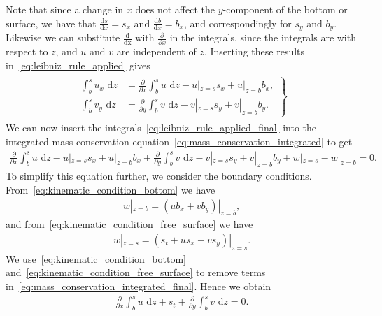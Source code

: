 Note that since a change in $x$ does not affect the $y$-component of the bottom or surface, we have that $\frac{\text{d} s}{\text{d} x} = s_x$ and $ \frac{\text{d} b}{\text{d} x} = b_x$, and correspondingly for $s_y$ and $b_y$.
Likewise we can substitute $\frac{\text{d}}{\text{dx}}$ with $\frac{\partial}{\partial x}$ in the integrals, since the integrals are with respect to $z$, and $u$ and $v$ are independent of $z$.
Inserting these results in~\eqref{eq:leibniz_rule_applied} gives
\begin{align}\label{eq:leibniz_rule_applied_final}
    \begin{gathered}
        \left.
            \begin{aligned}
                \int_{b}^{s} u_x \text{ d} z &=  \frac{\partial}{\partial x}  \int_{b}^{s} u \text{ d} z  - u|_{z = s} s_x + u|_{z = b} b_x, \\
                \int_{b}^{s} v_y \text{ d} z &= \frac{\partial}{\partial y}  \int_{b}^{s} v \text{ d} z  - v|_{z = s} s_y + v|_{z = b} b_y.
            \end{aligned}
        \right\}
    \end{gathered}
\end{align}
We can now insert the integrals~\eqref{eq:leibniz_rule_applied_final} into the integrated mass conservation equation~\eqref{eq:mass_conservation_integrated} to get
\begin{align}\label{eq:mass_conservation_integrated_final}
    \frac{\partial}{\partial x}  \int_{b}^{s} u \text{ d} z  - u|_{z = s} s_x + u|_{z = b} b_x
    + \frac{\partial}{\partial y}  \int_{b}^{s} v \text{ d} z  - v|_{z = s} s_y + v|_{z = b} b_y
    + w|_{z = s} - w|_{z = b} = 0.
\end{align}
To simplify this equation further, we consider the boundary conditions.
From~\eqref{eq:kinematic_condition_bottom} we have
\begin{align}
    w|_{z = b} = (u b_x + v b_y)|_{z = b},
\end{align}
and from~\eqref{eq:kinematic_condition_free_surface} we have
\begin{align}
    w|_{z = s} = (s_t + u s_x + v s_y)|_{z = s}.
\end{align}
We use~\eqref{eq:kinematic_condition_bottom} and~\eqref{eq:kinematic_condition_free_surface} to remove terms in~\eqref{eq:mass_conservation_integrated_final}.
Hence we obtain
\begin{align}\label{eq:mass_conservation_integrated_final_2}
    \frac{\partial}{\partial x}  \int_{b}^{s} u \text{ d} z + s_t  + \frac{\partial}{\partial y}  \int_{b}^{s} v \text{ d} z  = 0.
\end{align}
